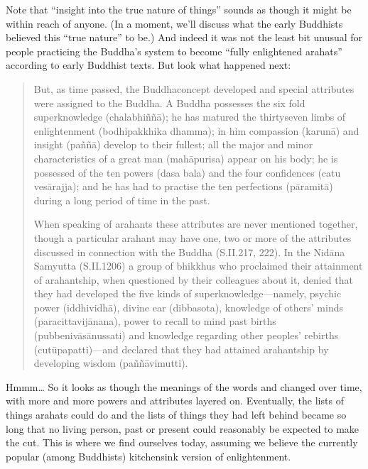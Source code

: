 \documentclass[a5paper,10pt,english]{book}
\begin{document}
\sphinxAtStartPar
Note that “insight into the true nature of things” sounds as though it
might be within reach of anyone. (In a moment, we’ll discuss what the
early Buddhists believed this “true nature” to be.) And indeed it was
not the least bit unusual for people practicing the Buddha’s system to
become “fully enlightened arahats” according to early Buddhist texts.
But look what happened next:
\begin{quote}

\sphinxAtStartPar
But, as time passed, the Buddha\sphinxhyphen{}concept developed and special
attributes were assigned to the Buddha. A Buddha possesses the six
fold super\sphinxhyphen{}knowledge (chalabhiññā); he has matured the thirty\sphinxhyphen{}seven
limbs of enlightenment (bodhipakkhika dhamma); in him compassion
(karunā) and insight (paññā) develop to their fullest; all the major
and minor characteristics of a great man (mahāpurisa) appear on his
body; he is possessed of the ten powers (dasa bala) and the four
confidences (catu vesārajja); and he has had to practise the ten
perfections (pāramitā) during a long period of time in the past.

\sphinxAtStartPar
When speaking of arahants these attributes are never mentioned
together, though a particular arahant may have one, two or more of
the attributes discussed in connection with the Buddha (S.II.217,
222). In the Nidāna Samyutta (S.II.120\sphinxhyphen{}6) a group of bhikkhus who
proclaimed their attainment of arahantship, when questioned by their
colleagues about it, denied that they had developed the five kinds
of super\sphinxhyphen{}knowledge—namely, psychic power (iddhi\sphinxhyphen{}vidhā), divine ear
(dibba\sphinxhyphen{}sota), knowledge of others’ minds (paracitta\sphinxhyphen{}vijānana), power
to recall to mind past births (pubbenivāsānussati) and knowledge
regarding other peoples’ rebirths (cutū\sphinxhyphen{}papatti)—and declared that
they had attained arahantship by developing wisdom (paññā\sphinxhyphen{}vimutti).
\end{quote}

\sphinxAtStartPar
Hmmm… So it looks as though the meanings of the words  and
 changed over time, with more and more powers and attributes
layered on. Eventually, the lists of things arahats could do and the
lists of things they had left behind became so long that no living
person, past or present could reasonably be expected to make the cut.
This is where we find ourselves today, assuming we believe the currently
popular (among Buddhists) kitchen\sphinxhyphen{}sink version of enlightenment.
\end{document}
